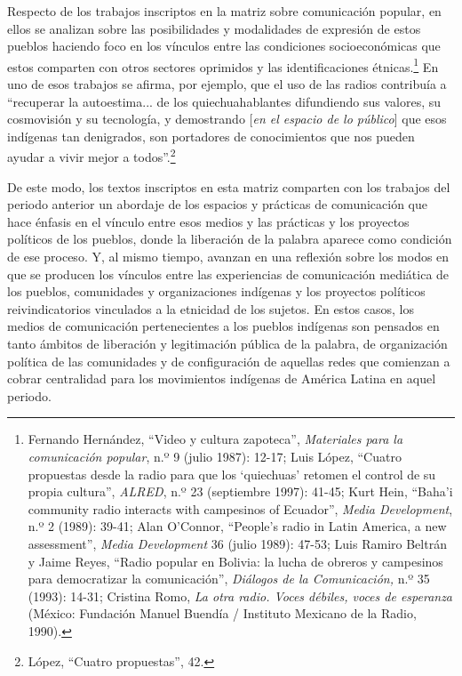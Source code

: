 \documentclass{tufte-handout}
\begin{document}
Respecto de los trabajos inscriptos en la matriz sobre comunicación
popular, en ellos se analizan sobre las posibilidades y modalidades de
expresión de estos pueblos haciendo foco en los vínculos entre las
condiciones socioeconómicas que estos comparten con otros sectores
oprimidos y las identificaciones étnicas.\footnote{Fernando Hernández,
  ``Video y cultura zapoteca'', \emph{Materiales para la comunicación
  popular}, n.º 9 (julio 1987): 12-17; Luis López, ``Cuatro propuestas
  desde la radio para que los `quiechuas' retomen el control de su
  propia cultura'', \emph{ALRED}, n.º 23 (septiembre 1997): 41-45; Kurt
  Hein, ``Baha'i community radio interacts with campesinos of Ecuador'',
  \emph{Media Development}, n.º 2 (1989): 39-41; Alan O'Connor,
  ``People's radio in Latin America, a new assessment'', \emph{Media
  Development} 36 (julio 1989): 47-53; Luis Ramiro Beltrán y Jaime
  Reyes, ``Radio popular en Bolivia: la lucha de obreros y campesinos
  para democratizar la comunicación'', \emph{Diálogos de la
  Comunicación,} n.º 35 (1993): 14-31; Cristina Romo, \emph{La otra
  radio. Voces débiles, voces de esperanza} (México: Fundación Manuel
  Buendía / Instituto Mexicano de la Radio, 1990).} En uno de esos
trabajos se afirma, por ejemplo, que el uso de las radios contribuía a
``recuperar la autoestima... de los quiechuahablantes difundiendo sus
valores, su cosmovisión y su tecnología, y demostrando {[}\emph{en el
espacio de lo público}{]} que esos indígenas tan denigrados, son
portadores de conocimientos que nos pueden ayudar a vivir mejor a
todos''.\footnote{López, ``Cuatro propuestas'', 42.}

De este modo, los textos inscriptos en esta matriz comparten con los
trabajos del periodo anterior un abordaje de los espacios y prácticas de
comunicación que hace énfasis en el vínculo entre esos medios y las
prácticas y los proyectos políticos de los pueblos, donde la liberación
de la palabra aparece como condición de ese proceso. Y, al mismo tiempo,
avanzan en una reflexión sobre los modos en que se producen los vínculos
entre las experiencias de comunicación mediática de los pueblos,
comunidades y organizaciones indígenas y los proyectos políticos
reivindicatorios vinculados a la etnicidad de los sujetos. En estos
casos, los medios de comunicación pertenecientes a los pueblos indígenas
son pensados en tanto ámbitos de liberación y legitimación pública de la
palabra, de organización política de las comunidades y de configuración
de aquellas redes que comienzan a cobrar centralidad para los
movimientos indígenas de América Latina en aquel periodo.
\end{document}
